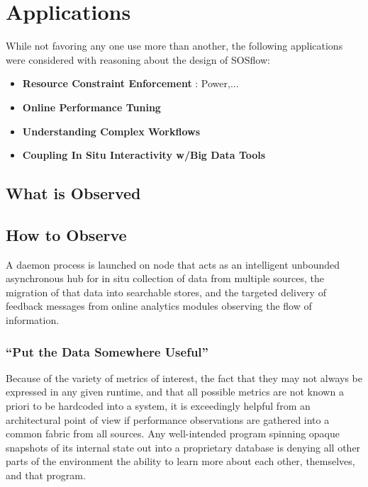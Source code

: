 
%
%
%


\section{Applications}
While not favoring any one use more than another, the following applications
were considered with reasoning about the design of SOSflow:
\begin{itemize}
\item \textbf{Resource Constraint Enforcement} : Power,...
\item \textbf{Online Performance Tuning}
\item \textbf{Understanding Complex Workflows}
\item \textbf{Coupling In Situ Interactivity w/Big Data Tools}
\end{itemize} 


\subsection{What is Observed}


\subsection{How to Observe}
A daemon process is launched on node that acts as an intelligent
unbounded asynchronous hub for in situ collection of data from
multiple sources, the migration of that data into searchable stores,
and the targeted delivery of feedback messages from online analytics
modules observing the flow of information.

\subsubsection{``Put the Data Somewhere Useful''}
Because of the variety of metrics of interest, the fact that they may
not always be expressed in any given runtime, and that all possible
metrics are not known a priori to be hardcoded into a system, it is
exceedingly helpful from an architectural point of view if performance
observations are gathered into a common fabric from all sources.
%
Any well-intended program spinning opaque snapshots of its internal
state out into a proprietary database is denying all other parts of
the environment the ability to learn more about each other,
themselves, and that program.


